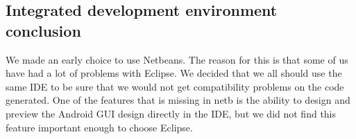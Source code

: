 \subsection{Integrated development environment conclusion}
We made an early choice to use Netbeans. The reason for this is that some of us have had a lot of problems with Eclipse. We decided that we all should use the same IDE to be sure that we would not get compatibility problems on the code generated. One of the features that is missing in  \gls{netb} is the ability to design and preview the Android GUI design directly in the IDE, but we did not find this feature important enough to choose Eclipse.
